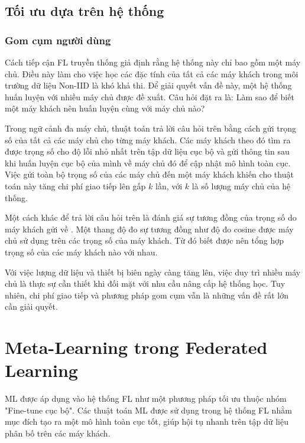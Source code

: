 \subsection{Tối ưu dựa trên hệ thống}

\subsubsection{Gom cụm người dùng}

Cách tiếp cận FL truyền thống giả định rằng hệ thống này chỉ bao gồm một máy chủ. Điều này làm cho việc học các đặc tính của tất cả các máy khách trong môi trường dữ liệu Non-IID là khó khả thi. Để giải quyết vấn đề này, một hệ thống huấn luyện với nhiều máy chủ được đề xuất. Câu hỏi đặt ra là: Làm sao để biết một máy khách nên huấn luyện cùng với máy chủ nào? 

Trong ngữ cảnh đa máy chủ, thuật toán  \cite{ghosh2020efficient} trả lời câu hỏi trên bằng cách gửi trọng số của tất cả các máy chủ cho từng máy khách. Các máy khách theo đó tìm ra được trọng số cho độ lỗi nhỏ nhất trên tập dữ liệu cục bộ và gửi thông tin sau khi huấn luyện cục bộ của mình về máy chủ đó để cập nhật mô hình toàn cục. Việc gửi toàn bộ trọng số của các máy chủ đến một máy khách khiến cho thuật toán này tăng chi phí giao tiếp lên gấp $k$ lần, với $k$ là số lượng máy chủ của hệ thống.

Một cách khác để trả lời câu hỏi trên là đánh giá sự tương đồng của trọng số do máy khách gửi về \cite{zhu2021federated}. Một thang độ đo sự tương đồng như độ đo cosine được máy chủ sử dụng trên các trọng số của máy khách. Từ đó biết được nên tổng hợp trọng số của các máy khách nào với nhau.

Với việc lượng dữ liệu và thiết bị biên ngày càng tăng lên, việc duy trì nhiều máy chủ là thực sự cần thiết khi đối mặt với nhu cầu nâng cấp hệ thống học. Tuy nhiên, chi phí giao tiếp và phương pháp gom cụm vẫn là những vấn đề rất lớn cần giải quyết.

\section{Meta-Learning trong Federated Learning}

ML được áp dụng vào hệ thống FL như một phương pháp tối ưu thuộc nhóm "Fine-tune cục bộ". Các thuật toán ML được sử dụng trong hệ thống FL nhằm mục đích tạo ra một mô hình toàn cục tốt, giúp hội tụ nhanh trên tập dữ liệu phân bố trên các máy khách.

